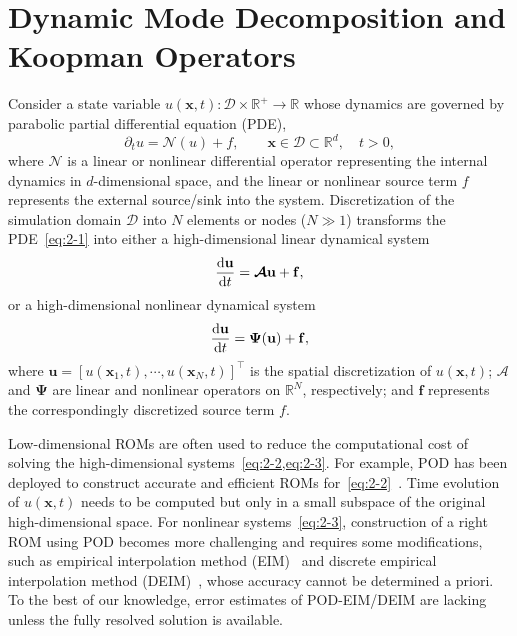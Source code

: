 \documentclass[10pt]{article}
\numberwithin{equation}{section}
\theoremstyle{plain}
\theoremstyle{remark}
\theoremstyle{remark}
\begin{document}
\section{Dynamic Mode Decomposition and Koopman Operators}
\label{sec:dmd}
Consider a state variable $u(\mathbf x,t) : \mathcal D \times \mathbb R^+ \rightarrow \mathbb R$ whose dynamics are governed by parabolic partial differential equation (PDE),
\begin{equation}\label{eq:2-1}
\partial_t u =\mathcal N(u)+f, \qquad \mathbf x \in \mathcal D \subset \mathbb R^d, \quad t > 0,
\end{equation}
where $\mathcal N$ is a linear or nonlinear differential operator representing the internal dynamics in $d$-dimensional space, and the linear or nonlinear source term  $f$ represents the external source/sink into the system. %
Discretization of the simulation domain $\mathcal D$ into $N$ elements or nodes ($N\gg 1$) transforms the PDE~\cref{eq:2-1} into either a high-dimensional linear dynamical system
\begin{equation}\label{eq:2-2}
\frac{\text d \mathbf u}{\text dt} = \boldsymbol{\mathcal A } \mathbf u+\mathbf f,
\end{equation}
or a high-dimensional nonlinear dynamical system
\begin{equation}\label{eq:2-3}
\frac{\text d \mathbf u}{\text dt} = \boldsymbol \Psi (\bold u)+\bold f,
\end{equation}
where $\mathbf u = [u(\mathbf x_1,t),\cdots,u(\mathbf x_N,t)]^\top$ is the spatial discretization of $u(\mathbf x,t)$; $\boldsymbol{\mathcal A}$ and $\boldsymbol \Psi$ are linear and nonlinear operators on $\mathbb R^N$, respectively; and $\mathbf f$ represents the correspondingly discretized source term $f$.

Low-dimensional ROMs are often used to reduce the computational cost of solving the high-dimensional systems~\cref{eq:2-2,eq:2-3}. For example, POD has been deployed to construct accurate and efficient ROMs for~\cref{eq:2-2}~\cite{kerschen2005method,rowley2005model}. Time evolution of $u(\mathbf x,t)$ needs to be computed but only in a small subspace of the original high-dimensional space. For nonlinear systems~\cref{eq:2-3}, construction of a right ROM using POD becomes more challenging and requires some modifications, such as empirical interpolation method (EIM)~\cite{barrault2004empirical} and discrete empirical interpolation method (DEIM)~\cite{chaturantabut2010nonlinear}, whose accuracy cannot be determined a priori. To the best of our knowledge, error estimates of POD-EIM/DEIM are lacking unless the fully resolved solution is available.
\end{document}
